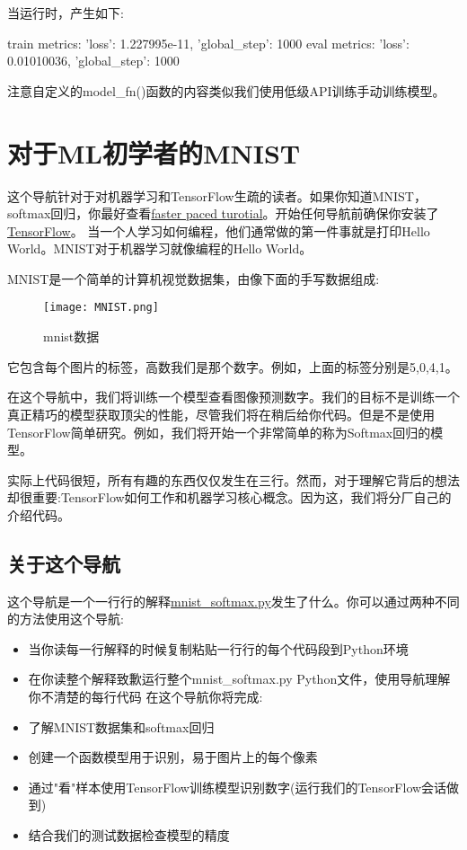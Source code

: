 当运行时，产生如下:
\begin{pythoncode}
train metrics: {'loss': 1.227995e-11, 'global_step': 1000}
eval metrics: {'loss': 0.01010036, 'global_step': 1000}
\end{pythoncode}
注意自定义的model\_fn()函数的内容类似我们使用低级API训练手动训练模型。

\section{对于ML初学者的MNIST}\label{sec:start}
这个导航针对于对机器学习和TensorFlow生疏的读者。如果你知道MNIST，softmax回归，你最好查看\href{https://www.tensorflow.org/get_started/mnist/pros}{faster paced turotial}。开始任何导航前确保你安装了\href{https://www.tensorflow.org/install/index}{TensorFlow}。
当一个人学习如何编程，他们通常做的第一件事就是打印Hello World。MNIST对于机器学习就像编程的Hello World。

MNIST是一个简单的计算机视觉数据集，由像下面的手写数据组成:
\begin{figure}[H]
\centering
\texttt{[image: MNIST.png]}
\caption{mnist数据}
\end{figure}
它包含每个图片的标签，高数我们是那个数字。例如，上面的标签分别是5,0,4,1。

在这个导航中，我们将训练一个模型查看图像预测数字。我们的目标不是训练一个真正精巧的模型获取顶尖的性能，尽管我们将在稍后给你代码。但是不是使用TensorFlow简单研究。例如，我们将开始一个非常简单的称为Softmax回归的模型。

实际上代码很短，所有有趣的东西仅仅发生在三行。然而，对于理解它背后的想法却很重要:TensorFlow如何工作和机器学习核心概念。因为这，我们将分厂自己的介绍代码。
\subsection{关于这个导航}
这个导航是一个一行行的解释\href{https://www.github.com/tensorflow/tensorflow/blob/r1.4/tensorflow/examples/tutorials/mnist/mnist_softmax.py}{mnist\_softmax.py}发生了什么。你可以通过两种不同的方法使用这个导航:
\begin{itemize}
\item 当你读每一行解释的时候复制粘贴一行行的每个代码段到Python环境
\item 在你读整个解释致歉运行整个mnist\_softmax.py Python文件，使用导航理解你不清楚的每行代码
在这个导航你将完成:
\item 了解MNIST数据集和softmax回归
\item 创建一个函数模型用于识别，易于图片上的每个像素
\item 通过"看"样本使用TensorFlow训练模型识别数字(运行我们的TensorFlow会话做到)
\item 结合我们的测试数据检查模型的精度
\end{itemize}

